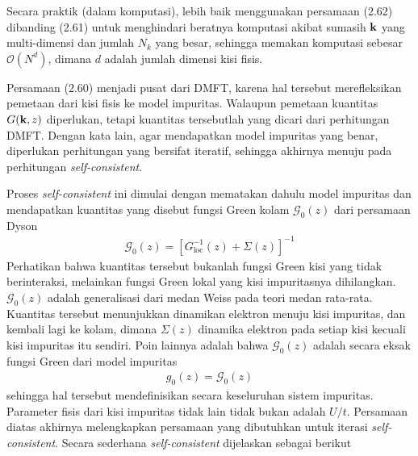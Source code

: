 Secara praktik (dalam komputasi), lebih baik menggunakan persamaan (2.62) dibanding (2.61) untuk menghindari beratnya komputasi akibat sumasih $\textbf{k}$ yang multi-dimensi dan jumlah $N_k$ yang besar, sehingga memakan komputasi sebesar $\mathcal{O}(N^d)$, dimana $d$ adalah jumlah dimensi kisi fisis.

Persamaan (2.60) menjadi pusat dari DMFT, karena hal tersebut merefleksikan pemetaan dari kisi fisis ke model impuritas. Walaupun pemetaan kuantitas $G(\textbf{k},z)$ diperlukan, tetapi kuantitas tersebutlah yang dicari dari perhitungan DMFT. Dengan kata lain, agar mendapatkan model impuritas yang benar, diperlukan perhitungan yang bersifat iteratif, sehingga akhirnya menuju pada perhitungan \textit{self-consistent}.

Proses \textit{self-consistent} ini dimulai dengan mematakan dahulu model impuritas dan mendapatkan kuantitas yang disebut fungsi Green kolam $\mathcal{G}_0(z)$ dari persamaan Dyson
\begin{align}
\mathcal{G}_0(z) = \left[ G^{-1}_{\text{loc}}(z) + \Sigma(z) \right]^{-1}
\end{align}
Perhatikan bahwa kuantitas tersebut bukanlah fungsi Green kisi yang tidak berinteraksi, melainkan fungsi Green lokal yang kisi impuritasnya dihilangkan. $\mathcal{G}_0(z)$ adalah generalisasi dari medan Weiss pada teori medan rata-rata. Kuantitas tersebut menunjukkan dinamikan elektron menuju kisi impuritas, dan kembali lagi ke kolam, dimana $\Sigma(z)$ dinamika elektron pada setiap kisi kecuali kisi impuritas itu sendiri. Poin lainnya adalah bahwa $\mathcal{G}_0(z)$ adalah secara eksak fungsi Green dari model impuritas
\begin{align}
g_0(z) = \mathcal{G}_0(z)
\end{align}
sehingga hal tersebut mendefinisikan secara keseluruhan sistem impuritas. Parameter fisis dari kisi impuritas tidak lain tidak bukan adalah $U/t$. Persamaan diatas akhirnya melengkapkan persamaan yang dibutuhkan untuk iterasi \textit{self-consistent}. Secara sederhana \textit{self-consistent} dijelaskan sebagai berikut
